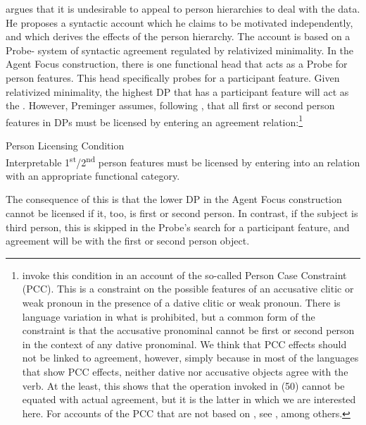 \documentclass[output=paper]{langsci/langscibook}
\begin{document}
\citet{Preminger2014} argues that it is undesirable to appeal to person hierarchies to deal with the  data. He proposes a syntactic account which he claims to be motivated independently, and which derives the effects of the person hierarchy. The account is based on a Probe- system of syntactic agreement regulated by relativized minimality. In the  Agent Focus construction, there is one functional head that acts as a Probe for person features. This head specifically probes for a participant feature. Given relativized minimality, the highest DP that has a participant feature will act as the . However, Preminger assumes, following \citet{Bejar2003}, that all first or second person features in DPs must be licensed by entering an agreement relation:\footnote{\citet{Bejar2003} invoke this condition in an account of the so-called Person Case Constraint (PCC). This is a constraint on the possible features of an accusative clitic or weak pronoun in the presence of a dative clitic or weak pronoun. There is language variation in what is prohibited, but a common form of the constraint is that the accusative pronominal cannot be first or second person in the context of any dative pronominal. We think that PCC effects should not be linked to agreement, however, simply because in most of the languages that show PCC effects, neither dative nor accusative objects agree with the verb. At the least, this shows that the  operation invoked in (50) cannot be equated with actual agreement, but it is the latter in which we are interested here. For accounts of the PCC that are not based on , see \citet{Haspelmath2004,Runić2013,Kiss2015}, among others.}

\ea \label{bkm:Ref454187927}  Person Licensing Condition \citep{Bejar2003}\\
Interpretable 1\textsuperscript{st}/2\textsuperscript{nd} person features must be licensed by entering into an  relation with an appropriate functional category.
\z

The consequence of this is that the lower DP in the Agent Focus construction cannot be licensed if it, too, is first or second person. In contrast, if the subject is third person, this is skipped in the Probe’s search for a participant feature, and agreement will be with the first or second person object.
\end{document}
